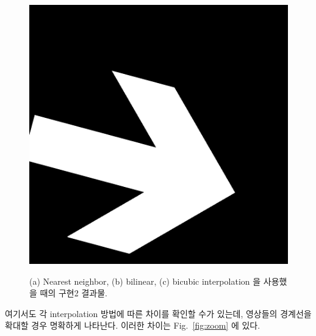 \documentclass[a4paper, 12p]{paper}
\begin{document}
\begin{figure}[H]
{\includegraphics[scale=0.25]{../data/bicubic_impl2.png}
}
\caption{(a) Nearest neighbor, (b) bilinear, (c) bicubic interpolation 을 사용했을 때의 구현2 결과물.}
\label{fig:result2}
\end{figure}

여기서도 각 interpolation 방법에 따른 차이를 확인할 수가 있는데, 영상들의 경계선을 확대할 경우 명확하게 나타난다. 이러한 차이는 Fig.~\ref{fig:zoom} 에 있다.
\end{document}
